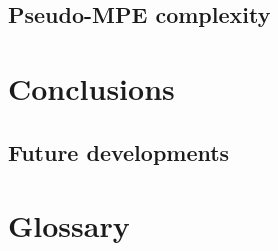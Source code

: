 \documentclass[mscthesis]{usiinfthesis}
\begin{document}
\section{Pseudo-MPE complexity}


\chapter{Conclusions}\label{chap:conclusions}


\section{Future developments}\label{sec:future-developments}



\appendix %


\backmatter

\chapter{Glossary} %

%
%



\end{document}
